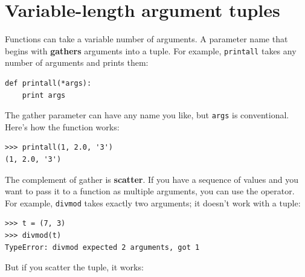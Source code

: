 \documentclass[10pt]{book}
\begin{document}
\section{Variable-length argument tuples}

Functions can take a variable number of arguments.  A parameter
name that begins with {\tt *} {\bf gathers} arguments into
a tuple.  For example, {\tt printall}
takes any number of arguments and prints them:

\begin{verbatim}
def printall(*args):
    print args
\end{verbatim}
%
The gather parameter can have any name you like, but {\tt args} is
conventional.  Here's how the function works:

\begin{verbatim}
>>> printall(1, 2.0, '3')
(1, 2.0, '3')
\end{verbatim}
%
The complement of gather is {\bf scatter}.  If you have a
sequence of values and you want to pass it to a function
as multiple arguments, you can use the {\tt *} operator.
For example, {\tt divmod} takes exactly two arguments; it
doesn't work with a tuple:


%

\begin{verbatim}
>>> t = (7, 3)
>>> divmod(t)
TypeError: divmod expected 2 arguments, got 1
\end{verbatim}
%
But if you scatter the tuple, it works:
\end{document}
